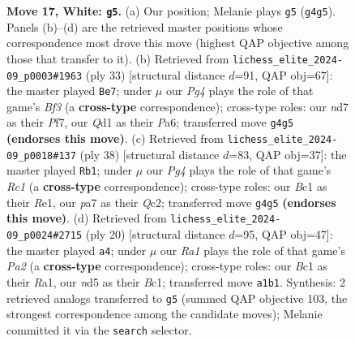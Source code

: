 \documentclass[11pt]{article}
\begin{document}
\begin{figure}[p]
\caption{\textbf{Move 17, White: \texttt{g5}.} (a) Our position; Melanie plays \texttt{g5} (\texttt{g4g5}). Panels (b)--(d) are the retrieved master positions whose correspondence most drove this move (highest QAP objective among those that transfer to it). (b) Retrieved from \texttt{lichess\_elite\_2024-09\_p0003\#1963} (ply 33) [structural distance $d$=91, QAP obj=67]: the master played \texttt{Be7}; under $\mu$ our \emph{Pg4} plays the role of that game's \emph{Bf3} (a \textbf{cross-type} correspondence); cross-type roles: our \emph{n}d7 as their \emph{P}f7, our \emph{Q}d1 as their \emph{P}a6; transferred move \texttt{g4g5} \textbf{(endorses this move)}. (c) Retrieved from \texttt{lichess\_elite\_2024-09\_p0018\#137} (ply 38) [structural distance $d$=83, QAP obj=37]: the master played \texttt{Rb1}; under $\mu$ our \emph{Pg4} plays the role of that game's \emph{Rc1} (a \textbf{cross-type} correspondence); cross-type roles: our \emph{B}c1 as their \emph{R}e1, our \emph{p}a7 as their \emph{Q}c2; transferred move \texttt{g4g5} \textbf{(endorses this move)}. (d) Retrieved from \texttt{lichess\_elite\_2024-09\_p0024\#2715} (ply 20) [structural distance $d$=95, QAP obj=47]: the master played \texttt{a4}; under $\mu$ our \emph{Ra1} plays the role of that game's \emph{Pa2} (a \textbf{cross-type} correspondence); cross-type roles: our \emph{B}c1 as their \emph{R}a1, our \emph{n}d5 as their \emph{B}c1; transferred move \texttt{a1b1}. Synthesis: 2 retrieved analogs transferred to \texttt{g5} (summed QAP objective 103, the strongest correspondence among the candidate moves); Melanie committed it via the \texttt{search} selector.}
\label{fig:thought-m32}
\end{figure}

\clearpage
\end{document}
